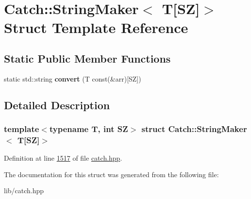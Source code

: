 \hypertarget{structCatch_1_1StringMaker_3_01T[SZ]_4}{}\section{Catch\+::String\+Maker$<$ T\mbox{[}SZ\mbox{]}$>$ Struct Template Reference}
\label{structCatch_1_1StringMaker_3_01T[SZ]_4}
\subsection*{Static Public Member Functions}
\begin{DoxyCompactItemize}
\item 
\mbox{\label{structCatch_1_1StringMaker_3_01T[SZ]_4_a3698cea2c24d8649ec9ecb5fa679eeb7}} 
static std\+::string {\bfseries convert} (T const(\&arr)\mbox{[}SZ\mbox{]})
\end{DoxyCompactItemize}


\subsection{Detailed Description}
\subsubsection*{template$<$typename T, int SZ$>$\newline
struct Catch\+::\+String\+Maker$<$ T\mbox{[}\+S\+Z\mbox{]}$>$}



Definition at line \mbox{\hyperlink{catch_8hpp_source_l01517}{1517}} of file \mbox{\hyperlink{catch_8hpp_source}{catch.\+hpp}}.



The documentation for this struct was generated from the following file\+:\begin{DoxyCompactItemize}
\item 
lib/catch.\+hpp\end{DoxyCompactItemize}
